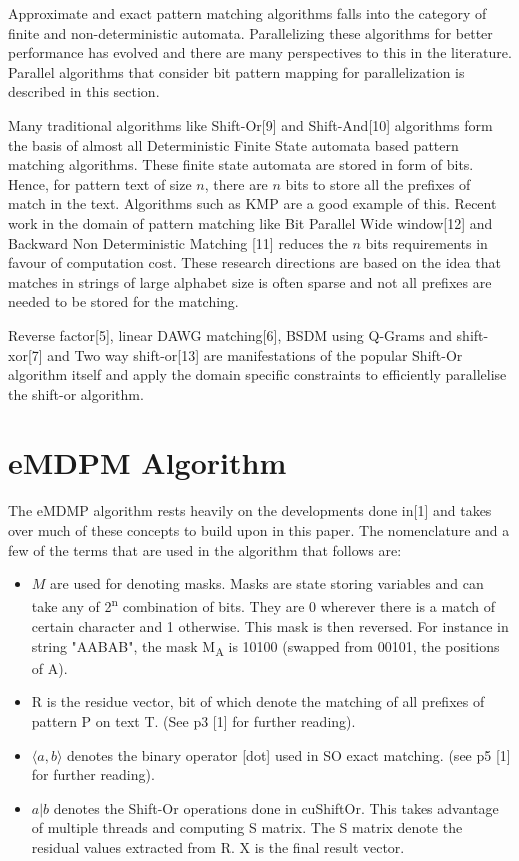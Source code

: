 \documentclass[graybox]{svmult}
\begin{document}
Approximate and exact pattern matching algorithms falls into the category of finite and non-deterministic automata. Parallelizing these algorithms for better performance has evolved and there are many perspectives to this in the literature. Parallel algorithms that consider bit pattern mapping for parallelization is described in this section.

Many traditional algorithms like Shift-Or[9] and Shift-And[10] algorithms form the basis of almost all Deterministic Finite State automata based pattern matching algorithms. These finite state automata are stored in form of bits. Hence, for pattern text of size $n$, there are $n$ bits to store all the prefixes of match in the text.  Algorithms such as KMP are a good example of this. Recent work in the domain of pattern matching like Bit Parallel Wide window[12] and Backward Non Deterministic Matching [11] reduces the $n$ bits requirements in favour of computation cost. These research directions are based on the idea that matches in strings of large alphabet size is often sparse and not all prefixes are needed to be stored for the matching.

Reverse factor[5], linear DAWG matching[6], BSDM using Q-Grams and shift-xor[7] and Two way shift-or[13] are manifestations of the popular Shift-Or algorithm itself and apply the domain specific constraints to efficiently parallelise the shift-or algorithm.

\section{eMDPM Algorithm}
\label{sec:3}

The eMDMP algorithm rests heavily on the developments done in[1] and takes over much of these concepts to build upon in this paper. The nomenclature and a few of the terms that are used in the algorithm that follows are:

\begin{itemize}
\item{$M$ are used for denoting masks. Masks are state storing variables and can take any of 2\textsuperscript{n} combination of bits. They are 0 wherever there is a match of certain character and 1 otherwise. This mask is then reversed. For instance in string "AABAB", the mask M\textsubscript{A} is 10100 (swapped from 00101, the positions of A).}
\item{R is the residue vector, bit of which denote the matching of all prefixes of pattern P on text T. (See p3 [1] for further reading). }
\item{$\langle a,b \rangle$ denotes the binary operator [dot] used in SO exact matching. (see p5 [1] for further reading). }
\item{$a \vert b$ denotes the Shift-Or operations done in cuShiftOr. This takes advantage of multiple threads and computing S matrix. The S matrix denote the residual values extracted from R. X is the final result vector. }
\end{itemize}
\end{document}
